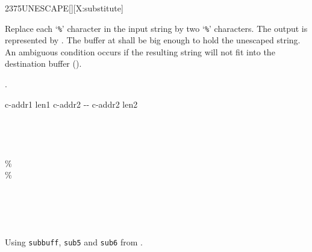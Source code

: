 \begin{worddef}{2375}{UNESCAPE}[][X:substitute]
\item {}

	Replace each `\texttt{\%}' character in the input string
	 by two `\texttt{\%}' characters.  The output
	is represented by .  The buffer at 
	shall be big enough to hold the unescaped string.  An ambiguous
	condition occurs if the resulting string will not fit into the
	destination buffer ().

\see {}.

	\begin{implement}
		\word{:}   c-addr1 len1 c-addr2 -{}- c-addr2 len2 \\
		  \\
		  \\
		  \\
		\tab {}    \word{+}   \\
		\tab[2]   \word{[CHAR]} \% \word{=}  \\
		\tab[3] \word{[CHAR]} \%    \\
		\tab[2]  \\
		\tab[2]      \\
		\tab {} \\
		\tab {} \word{-} \\
		\word{;}
	\end{implement}

	\begin{testing}
		Using \texttt{subbuff}, \texttt{sub5} and \texttt{sub6} from .

	\end{testing}
\end{worddef}
\endinput

